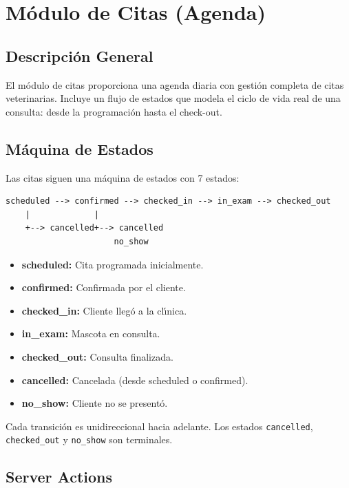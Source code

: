 \chapter{M\'odulo de Citas (Agenda)}

\section{Descripci\'on General}

El m\'odulo de citas proporciona una agenda diaria con gesti\'on completa
de citas veterinarias. Incluye un flujo de estados que modela el ciclo de
vida real de una consulta: desde la programaci\'on hasta el check-out.

\section{M\'aquina de Estados}

Las citas siguen una m\'aquina de estados con 7 estados:

\begin{verbatim}
scheduled --> confirmed --> checked_in --> in_exam --> checked_out
    |             |
    +--> cancelled+--> cancelled
                      no_show
\end{verbatim}

\begin{itemize}[leftmargin=*]
    \item \textbf{scheduled:} Cita programada inicialmente.
    \item \textbf{confirmed:} Confirmada por el cliente.
    \item \textbf{checked\_in:} Cliente lleg\'o a la cl\'{\i}nica.
    \item \textbf{in\_exam:} Mascota en consulta.
    \item \textbf{checked\_out:} Consulta finalizada.
    \item \textbf{cancelled:} Cancelada (desde scheduled o confirmed).
    \item \textbf{no\_show:} Cliente no se present\'o.
\end{itemize}

Cada transici\'on es unidireccional hacia adelante. Los estados
\texttt{cancelled}, \texttt{checked\_out} y \texttt{no\_show} son
terminales.

\section{Server Actions}


